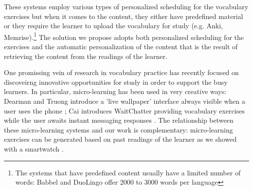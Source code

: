 These systems employ various types of personalized scheduling for the vocabulary exercises but when it comes to the content, they either have predefined material or they require the learner to upload the vocabulary for study (e.g. Anki, Memrise).\footnote{The systems that have predefined content usually have a limited number of words: Babbel and DuoLingo offer 2000 to 3000 words per language} 
The solution we propose adopts both personalized scheduling for the exercises and the automatic personalization of the content that is the result of retrieving the content from the readings of the learner.









One promissing vein of research in vocabulary practice has recently focused on discoveirng innovative opportunities for study in order to support the busy learners. In particular, micro-learning has been used in very creative ways:
% 
	Dearman and Truong introduce a 'live wallpaper' interface always visible when a user uses the phone \cite{Dear12-ImplicitAcquisition};
% 
	Cai introduces WaitChatter providing vocabulary exercises while the user awaits instant messaging responses \cite{Cai15-wait}.
% 
The relationship between these micro-learning systems and our work is complementary: micro-learning exercises can be generated based on past readings of the learner as we showed with a smartwatch \cite{Nien16-time}.

















